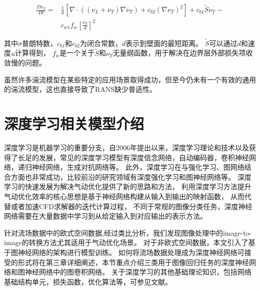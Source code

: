 \begin{equation}\label{SA_equo}
\begin{split}
\frac{D \nu_{T}}{D t}=& \frac{1}{\sigma}\left[\nabla \cdot((\nu_{L}+\nu_{T}) \nabla \nu_{T})+c_{b 2}(\nabla \nu_{T})^{2}\right] +c_{b 1} \tilde{S} \nu_{T} - \\ &c_{w 1} f_{w}\left[\frac{\nu_{T}}{d}\right]^{2}
\end{split}
\end{equation}

\noindent 其中$\sigma$普朗特数，$c_{b 1}$和$c_{b 2}$为闭合常数，$d$表示到壁面的最短距离。
$\tilde{S}$可以通过$d$和速度$u$计算得到，
$f_{w}$是一个关于$\tilde{S}$和$\nu_{T}$无量纲函数，用于解决在边界层外部损失项收敛慢的问题。

虽然许多湍流模型在某些特定的应用场景取得成功，但至今仍未有一个有效的通用的湍流模型，这也直接导致了RANS缺少普适性。



\section{深度学习相关模型介绍}
深度学习是机器学习的重要分支，自2006年提出以来，深度学习理论和技术以及获得了长足的发展，常见的深度学习模型有深度信念网络\cite{深度信念网络}，自动编码器\cite{Bengio2013Representation}，卷积神经网络\cite{Lecun1998Gradient}，递归神经网络\cite{Williams2014A}，生成对抗网络\cite{GAN}等。
此外，深度学习在与强化学习、图网络结合方面也非常成功，比较前沿的研究领域有深度强化学习\cite{Deepreinforcementlearning}和图神经网络\cite{2016Semi}等。
深度学习的快速发展为解决气动优化提供了新的思路和方法，
利用深度学习方法提升气动优化效率的核心思想是基于神经网络构建从输入到输出的映射函数，
从而代替或者加速CFD求解器的迭代计算过程，
不同于常规的图像分类任务，深度神经网络需要在大量数据中学习到从给定输入到对应输出的表示方法。

针对流场数据中的欧式空间数据,经过类比分析，我们发现图像处理中的image-to-image\cite{DBLP:conf/miccai/RonnebergerFB15,DBLP:conf/cvpr/LongSD15,isola2017image,CycleGAN2017,DBLP:conf/cvpr/AmodioK19}的转换方法尤其适用于气动优化场景。
对于非欧式空间数据，本文引入了基于图神经网络的架构进行模型训练。
如何将流场数据处理成为深度神经网络可接受的形式将在第三章详细阐述，本节重点介绍三类用于图像回归任务的深度神经网络和图神经网络中的图卷积网络。
关于深度学习的其他基础理论知识，包括网络基础结构单元，损失函数，优化算法等，可参见文献\cite{dnnsurvey}。

